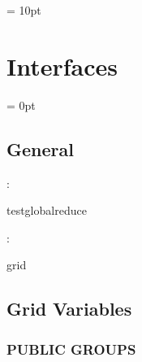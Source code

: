 \vspace{0.5cm}\parskip = 10pt 

\section{Interfaces} 


\parskip = 0pt

\vspace{3mm} \subsection*{General}

: 

testglobalreduce
\vspace{2mm}

: 

grid
\vspace{2mm}
\subsection*{Grid Variables}
\vspace{5mm}\subsubsection{PUBLIC GROUPS}

\vspace{5mm}

